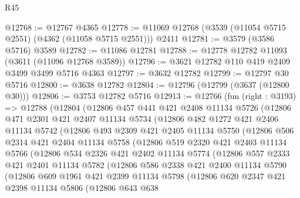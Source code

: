 \begin{lexlean}{R45}
\begin{coremodule}
@12768 := @12767 @4365
@12778 := @11069 @12768 (@3539 (@11054 @5715 @2551) (@4362 (@11058 @5715 @2551))) @2411
@12781 := @3579 (@3586 @5716) @3589
@12782 := @11086 @12781
@12788 := @12778 @12782 @11093 (@3611 (@11096 @12768 @3589))
@12796 := @3621 @12782 @110 @419 @2409 @3499 @3499 @5716 @4363
@12797 := @3632 @12782
@12799 := @12797 @30 @5716
@12800 := @3638 @12782
@12804 := @12796 (@12799 (@3637 (@12800 @30)))
@12806 := @3753 @12782 @5716
@12913 := @12766
    (fun (right : @3193) =>
    @12788
      (@12804
        (@12806
          @457
          @441
          @421
          @2408
          @11134
          @5726
          (@12806
            @471
            @2301
            @421
            @2407
            @11134
            @5734
            (@12806
              @482
              @1272
              @421
              @2406
              @11134
              @5742
              (@12806
                @493
                @2309
                @421
                @2405
                @11134
                @5750
                (@12806
                  @506
                  @2314
                  @421
                  @2404
                  @11134
                  @5758
                  (@12806
                    @519
                    @2320
                    @421
                    @2403
                    @11134
                    @5766
                    (@12806
                      @534
                      @2326
                      @421
                      @2402
                      @11134
                      @5774
                      (@12806
                        @557
                        @2333
                        @421
                        @2401
                        @11134
                        @5782
                        (@12806
                          @586
                          @2338
                          @421
                          @2400
                          @11134
                          @5790
                          (@12806
                            @609
                            @1961
                            @421
                            @2399
                            @11134
                            @5798
                            (@12806
                              @620
                              @2347
                              @421
                              @2398
                              @11134
                              @5806
                              (@12806
                                @643
                                @638

\end{coremodule}
\end{lexlean}
